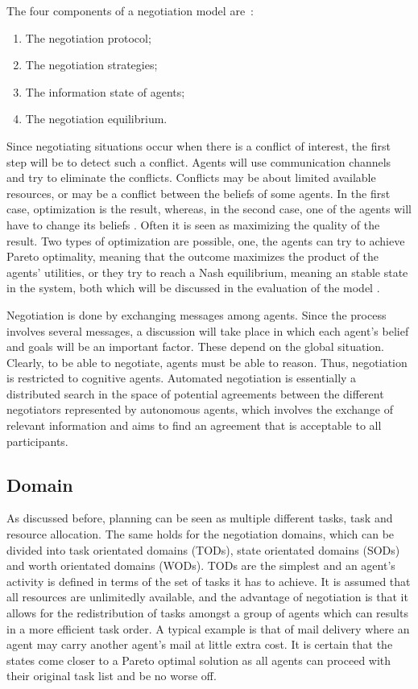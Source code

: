 The four components of a negotiation model are~\citep{fatima2004agenda}:
\begin{enumerate}
	\item The negotiation protocol;
	\item The negotiation strategies;
	\item The information state of agents;
	\item The negotiation equilibrium.
\end{enumerate}

Since negotiating situations occur when there is a conflict of interest, the first step will be to detect such a conflict. Agents will use communication channels and try to eliminate the conflicts. Conflicts may be about limited available resources, or may be a conflict between the beliefs of some agents. In the first case, optimization is the result, whereas, in the second case, one of the agents will have to change its beliefs \citep{shen2003multi}. Often it is seen as maximizing the quality of the result. Two types of optimization are possible, one, the agents can try to achieve Pareto optimality, meaning that the outcome maximizes the product of the agents' utilities, or they try to reach a Nash equilibrium, meaning an stable state in the system, both which will be discussed in the evaluation of the model .

Negotiation is done by exchanging messages among agents. Since the process involves several messages, a discussion will take place in which each agent's belief and goals will be an important factor. These depend on the global situation. Clearly, to be able to negotiate, agents must be able to reason. Thus, negotiation is restricted to cognitive agents. Automated negotiation is essentially a distributed search in the space of potential agreements between the different negotiators represented by autonomous agents, which involves the exchange of relevant information and aims to find an agreement that is acceptable to all participants.

\subsection{Domain}

As discussed before, planning can be seen as multiple different tasks, task and resource allocation. The same holds for the negotiation domains, which can be divided into task orientated domains (TODs), state orientated domains (SODs) and worth orientated domains (WODs). TODs are the simplest and an agent's activity is defined in terms of the set of tasks it has to achieve. It is assumed that all resources are unlimitedly available, and the advantage of negotiation is that it allows for the redistribution of tasks amongst a group of agents which can results in a more efficient task order. A typical example is that of mail delivery where an agent may carry another agent's mail at little extra cost. It is certain that the states come closer to a Pareto optimal solution as all agents can proceed with their original task list and be no worse off. 

